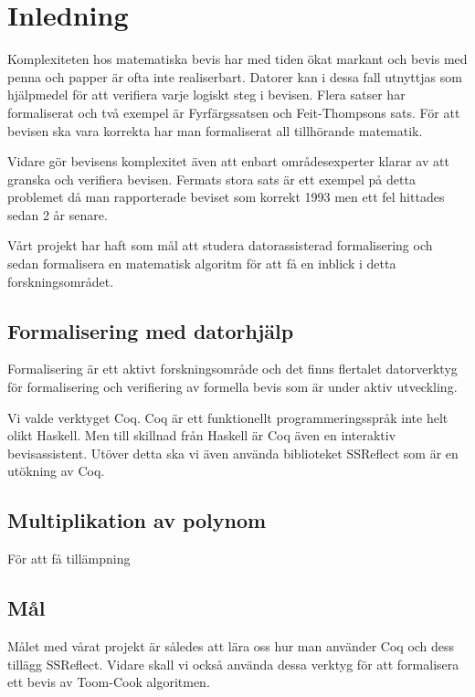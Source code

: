 \section{Inledning}
Komplexiteten hos matematiska bevis har med tiden ökat markant och bevis med
penna och papper är ofta inte realiserbart. Datorer kan i dessa fall utnyttjas
som hjälpmedel för att verifiera varje logiskt steg i bevisen. Flera satser har
formaliserat och två exempel är Fyrfärgssatsen\cite{gonthier2008formal} och
Feit-Thompsons sats\cite{something}. För att bevisen ska vara korrekta har man
formaliserat all tillhörande matematik.

Vidare gör bevisens komplexitet även att enbart områdesexperter klarar av att
granska och verifiera bevisen. Fermats stora sats är ett exempel på detta
problemet då man rapporterade beviset som korrekt 1993 men ett fel hittades
sedan 2 år senare\cite{something}.

Vårt projekt har haft som mål att studera datorassisterad formalisering och
sedan formalisera en matematisk algoritm för att få en inblick i detta
forskningsområdet.

\subsection{Formalisering med datorhjälp}
Formalisering är ett aktivt forskningsområde och det finns flertalet
datorverktyg för formalisering och verifiering av formella bevis som är under
aktiv utveckling.

Vi valde verktyget Coq. Coq är ett funktionellt programmeringsspråk inte helt
olikt Haskell. Men till skillnad från Haskell är Coq även en interaktiv
bevisassistent. Utöver detta ska vi även använda biblioteket SSReflect som är
en utökning av Coq.

\subsection{Multiplikation av polynom}
För att få tillämpning

\subsection{Mål}
Målet med vårat projekt är således att lära oss hur man använder Coq och dess
tillägg SSReflect. Vidare skall vi också använda dessa verktyg för att
formalisera ett bevis av Toom-Cook algoritmen.
